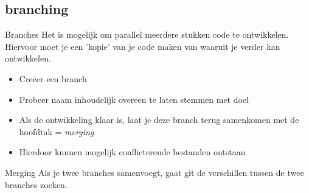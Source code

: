 \documentclass[11pt]{beamer}
\begin{document}
\subsection{branching}
\begin{frame}{Branches}
Het is mogelijk om parallel meerdere stukken code te ontwikkelen. Hiervoor moet je een 'kopie' van je code maken van waaruit je verder kan ontwikkelen.\\

\begin{itemize}
\item Creëer een branch
\item Probeer naam inhoudelijk overeen te laten stemmen met doel
\item Als de ontwikkeling klaar is, laat je deze branch terug samenkomen met de hoofdtak = \textit{merging}
\item Hierdoor kunnen mogelijk conflicterende bestanden ontstaan
\end{itemize}
\end{frame}

\begin{frame}{Merging}
Als je twee branches samenvoegt, gaat git de verschillen tussen de twee branches zoeken. \\

\end{frame}
\end{document}
